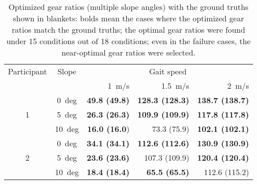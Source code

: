 \documentclass[twocolumn]{svjour3}          %
\begin{document}
\begin{table*}[tb]
    \centering
    \caption{Optimized gear ratios (multiple slope angles) with the ground truths shown in blankets:
    bolds mean the cases where the optimized gear ratios match the ground truths;
    the optimal gear ratios were found under 15 conditions out of 18 conditions;
    even in the failure cases, the near-optimal gear ratios were selected.
    }
    \begin{tabular}{|c|c|r|r|r|}
        \hline
        Participant & Slope & \multicolumn{3}{|c|}{Gait speed}
        \\ \cline{3-5}
        & & 1~m/s & 1.5~m/s &  2~m/s
        \\ \hline
        & 0~deg & \textbf{ 49.8 (49.8)} & \textbf{ 128.3 (128.3)}& \textbf{ 138.7 (138.7)}
        \\ \cline{2-5}
        1 & 5~deg & \textbf{ 26.3 (26.3)}&\textbf{ 109.9 (109.9)}&\textbf{ 117.8 (117.8)}
        \\ \cline{2-5}
        & 10~deg & \textbf{ 16.0 (16.0})& 73.3 (75.9)& \textbf{ 102.1 (102.1)}
        \\ \hline
        & 0~deg & \textbf{ 34.1 (34.1)}&\textbf{ 112.6 (112.6)}&\textbf{ 130.9 (130.9)}
        \\ \cline{2-5}
        2 & 5~deg & \textbf{ 23.6 (23.6)}&  107.3 (109.9)& \textbf{ 120.4 (120.4)}
        \\ \cline{2-5}
        & 10~deg & \textbf{ 18.4 (18.4)}& \textbf{ 65.5 (65.5)}&  112.6 (115.2)
        \\ \hline
    \end{tabular}
    \label{tab:exp_result_opt}
\end{table*}
\end{document}
